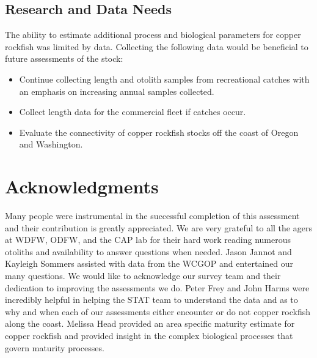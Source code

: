 \documentclass[11pt,
  english,
  a4paper,
]{article}
\begin{document}
\leavevmode\tagmcend\tagstructend\par


\hypertarget{research-and-data-needs}{%
\subsection{Research and Data Needs}\label{research-and-data-needs}}

\leavevmode\tagmcend\tagstructend


The ability to estimate additional process and biological parameters for copper rockfish was limited by data. Collecting the following data would be beneficial to future assessments of the stock:

\leavevmode\tagmcend\tagstructend\par

\begin{itemize}

    \item Continue collecting length and otolith samples from recreational catches with an emphasis on increasing annual samples collected.

    \item Collect length data for the commercial fleet if catches occur.

    \item Evaluate the connectivity of copper rockfish stocks off the coast of Oregon and Washington. 

\end{itemize}


\hypertarget{acknowledgments}{%
\section{Acknowledgments}\label{acknowledgments}}

\leavevmode\tagmcend\tagstructend


Many people were instrumental in the successful completion of this assessment and their contribution is greatly appreciated. We are very grateful to all the agers at WDFW, ODFW, and the CAP lab for their hard work reading numerous otoliths and availability to answer questions when needed. Jason Jannot and Kayleigh Sommers assisted with data from the WCGOP and entertained our many questions. We would like to acknowledge our survey team and their dedication to improving the assessments we do. Peter Frey and John Harms were incredibly helpful in helping the STAT team to understand the data and as to why and when each of our assessments either encounter or do not copper rockfish along the coast. Melissa Head provided an area specific maturity estimate for copper rockfish and provided insight in the complex biological processes that govern maturity processes.
\end{document}

